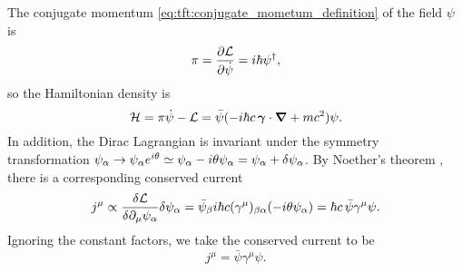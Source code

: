 The conjugate momentum \eqref{eq:tft:conjugate_mometum_definition} of the field $\psi$ is
\begin{equation}
	\pi = \pdv{\mathcal{L}}{\dot{\psi}} = i \hbar \psi^\dagger ,
\end{equation}
so the Hamiltonian density is
\begin{equation}
	\mathcal{H} = \pi \dot\psi - \mathcal{L} = \bar\psi ( -i \hbar c \, {\bm{\gamma}} \cdot {\bm{\nabla}} + m c^2 ) \psi .
\label{eq:tft:dirac_hamiltonian}
\end{equation}
In addition, the Dirac Lagrangian is invariant under the symmetry transformation $\psi_\alpha \rightarrow \psi_\alpha e^{i \theta} \simeq \psi_\alpha - i \theta \psi_\alpha = \psi_\alpha + \delta\psi_\alpha$.
By Noether's theorem \cite[equation 5.7]{ref:kachelriess}, there is a corresponding conserved current
\begin{equation}
	j^\mu \propto \fdv{\lagr}{\partial_\mu \psi_\alpha} \delta \psi_\alpha = \bar\psi_\beta i \hbar c (\gamma^\mu)_{\beta \alpha} (-i \theta \psi_\alpha) = \hbar c \, \bar\psi \gamma^\mu \psi .
\end{equation}
Ignoring the constant factors, we take the conserved current to be
\begin{equation}
	j^\mu = \bar\psi \gamma^\mu \psi .
\label{eq:tft:dirac_conserved_current}
\end{equation}

